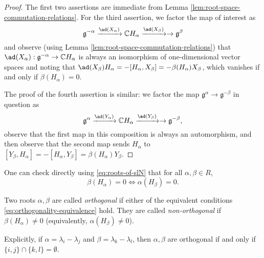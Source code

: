 \documentclass[reqno]{amsart} 
\begin{document}
\begin{proof}
  The first two assertions are immediate from Lemma \ref{lem:root-space-commutation-relations}.  For the third assertion, we factor the map of interest as
  \begin{equation*}
    \mathfrak{g}^{-\alpha} \xrightarrow{\ad(X_\alpha)} \mathbb{C} H_\alpha \xrightarrow{\ad(X_\beta)} \rightarrow \mathfrak{g}^{\beta}
  \end{equation*}
  and observe (using Lemma \ref{lem:root-space-commutation-relations}) that $\ad(X_\alpha) : \mathfrak{g}^{-\alpha} \rightarrow \mathbb{C} H_\alpha$ is always an isomorphism of one-dimensional vector spaces and noting that $\ad(X_\beta) H_\alpha = -[H_\alpha,X_\beta] = - \beta(H_\alpha) X_\beta$, which vanishes if and only if $\beta(H_\alpha) = 0$.

  The proof of the fourth assertion is similar: we factor the map $\mathfrak{g}^{\alpha} \rightarrow \mathfrak{g}^{-\beta}$ in question as
  \begin{equation*}
    \mathfrak{g}^{\alpha} \xrightarrow{\ad(Y_\alpha)} \mathbb{C} H_\alpha \xrightarrow{\ad(Y_\beta)} \rightarrow \mathfrak{g}^{-\beta},
  \end{equation*}
  observe that the first map in this composition is always an automorphism, and then observe that the second map sends $H_\alpha$ to $[Y_\beta,H_\alpha] = - [H_\alpha,Y_\beta] = \beta(H_\alpha) Y_\beta$.
\end{proof}

One can check directly using \eqref{eq:roots-of-slN} that for all $\alpha,\beta \in R$,
\begin{equation}\label{eq:orthogonality-equivalence}
  \beta(H_\alpha) = 0
  \iff \alpha(H_\beta) = 0.
\end{equation}
\begin{definition}\label{defn:orthogonal-roots}
  Two roots $\alpha, \beta$ are called \emph{orthogonal} if either of the equivalent conditions \eqref{eq:orthogonality-equivalence} hold.  They are called \emph{non-orthogonal} if $\beta(H_\alpha) \neq 0$ (equivalently, $\alpha(H_\beta) \neq 0$).
\end{definition}
Explicitly, if $\alpha = \lambda_i - \lambda_j$ and $\beta = \lambda_k - \lambda_l$, then $\alpha,\beta$ are orthogonal if and only if $\{i,j\} \cap \{k,l\} = \emptyset$.
\end{document}
